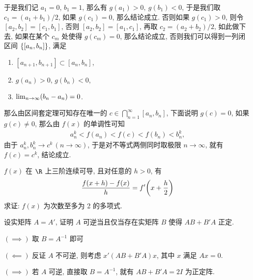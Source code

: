 \begin{exercise}[series=exer]
\begin{answer}
      于是我们记 $ a_{1} = 0 $, $ b_{1} = 1 $, 那么有 $ g(a_{1}) > 0,\ g(b_{1}) < 0 $, 于是我们取 $ c_{1} = (a_{1} + b_{1})/2 $, 如果 $ g(c_{1}) = 0 $, 那么结论成立. 否则如果 $ g(c_{1}) > 0 $, 则令 $ [a_{2}, b_{2}] = [c_{1}, b_{1}] $, 否则 $ [a_{2}, b_{2}] = [a_{1}, c_{1}] $, 再取 $ c_{2} = (a_{2} + b_{2})/2 $, 如此做下去, 如果在某个 $ c_{m} $ 处使得 $ g(c_{m}) = 0 $, 那么结论成立, 否则我们可以得到一列闭区间 $ \qty{[a_{n}, b_{n}]} $, 满足
      \begin{enumerate}
          \item $ [a_{n + 1}, b_{n + 1}] \subset [a_{n}, b_{n}] $,
          \item $ g(a_{n}) > 0 $, $ g(b_{n}) < 0 $,
          \item $ \lim_{n \to \infty}(b_{n} - a_{n}) = 0 $.
      \end{enumerate}
      那么由区间套定理可知存在唯一的 $ c \in \bigcap_{n = 1}^{\infty} [a_{n}, b_{n}] $, 下面说明 $ g(c) = 0 $, 如果 $ g(c) \ne 0 $, 那么由 $ f(x) $ 的单调性可知
      \begin{align*}
          a_{n}^{k} < f(a_{n}) < f(c) < f(b_{n}) < b_{n}^{k},
      \end{align*}
      由于 $ a_{n}^{k}, b_{n}^{k} \to c^{k}\,(n \to \infty) $, 于是对不等式两侧同时取极限 $ n \to \infty $, 就有 $ f(c) = c^{k} $, 结论成立.
  \end{answer}
  \item $ f(x) $ 在 $ \R $ 上三阶连续可导, 且对任意的 $ h > 0 $, 有
  \begin{align*}
      \frac{f(x + h) - f(x)}{h} = f'\qty(x + \frac{h}{2})
  \end{align*}
  求证: $ f(x) $ 为次数至多为 2 的多项式.
  \item 设实矩阵 $ A = A' $, 证明 $ A $ 可逆当且仅当存在实矩阵 $ B $ 使得 $ AB + B'A $ 正定.
  \begin{hint}
      $ (\implies) $ 取 $ B = A^{-1} $ 即可

      $ (\impliedby) $ 反证 $ A $ 不可逆, 则考虑 $ x'(AB + B'A)x $, 其中 $ x $ 满足 $ Ax = 0 $.
  \end{hint}
  \begin{answer}
      $ (\implies) $ 若 $ A $ 可逆, 直接取 $ B = A^{-1} $, 就有 $ AB + B'A = 2I $ 为正定阵.


\end{answer}
\end{exercise}
